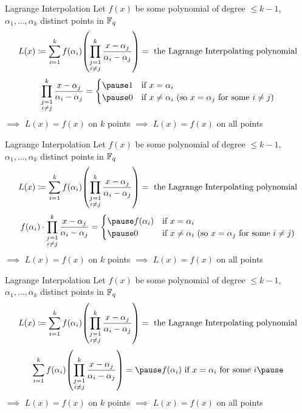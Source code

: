 \documentclass[aspectratio=169]{beamer}
\begin{document}
\begin{frame}{Lagrange Interpolation}
    Let $f(x)$ be some polynomial of degree $\leq k - 1$, $\alpha_1, \ldots, \alpha_{k}$ distinct points in $\mathbb{F}_q$
    \[
        L(x) \defeq \sum_{i = 1}^{k} f(\alpha_i) \pqty{\prod_{\substack{j = 1 \\ i \neq j}}^{k} \frac{x - \alpha_j}{\alpha_i - \alpha_j}} = \text{ the \emph{Lagrange Interpolating polynomial}}
    \]\pause
    \[
    \Prod_{\substack{j = 1 \\ i \neq j}}^{k} \frac{x - \alpha_j}{\alpha_i - \alpha_j} =     
    \begin{cases}\pause
        1 & \text{if } x = \alpha_i \\\pause
        0 & \text{if } x \neq \alpha_i\ (\text{so } x = \alpha_j\text{ for some } i \neq j)
    \end{cases}
    \]
    {\color{white}$\implies$ $L(x) = f(x)$ on $k$ points $\implies$ $L(x) = f(x)$ on all points}
\end{frame}

\begin{frame}{Lagrange Interpolation}
    Let $f(x)$ be some polynomial of degree $\leq k - 1$, $\alpha_1, \ldots, \alpha_{k}$ distinct points in $\mathbb{F}_q$
    \[
        L(x) \defeq \sum_{i = 1}^{k} f(\alpha_i) \pqty{\prod_{\substack{j = 1 \\ i \neq j}}^{k} \frac{x - \alpha_j}{\alpha_i - \alpha_j}} = \text{ the \emph{Lagrange Interpolating polynomial}}
    \]
    \[
    f(\alpha_i) \cdot \Prod_{\substack{j = 1 \\ i \neq j}}^{k} \frac{x - \alpha_j}{\alpha_i - \alpha_j} =     
    \begin{cases}\pause
        f(\alpha_i) & \text{if } x = \alpha_i \\\pause
        0 & \text{if } x \neq \alpha_i\ (\text{so } x = \alpha_j\text{ for some } i \neq j)
    \end{cases}
    \]
    {\color{white}$\implies$ $L(x) = f(x)$ on $k$ points $\implies$ $L(x) = f(x)$ on all points}
\end{frame}

\begin{frame}{Lagrange Interpolation}
    Let $f(x)$ be some polynomial of degree $\leq k - 1$, $\alpha_1, \ldots, \alpha_{k}$ distinct points in $\mathbb{F}_q$
    \[
        L(x) \defeq \sum_{i = 1}^{k} f(\alpha_i) \pqty{\prod_{\substack{j = 1 \\ i \neq j}}^{k} \frac{x - \alpha_j}{\alpha_i - \alpha_j}} = \text{ the \emph{Lagrange Interpolating polynomial}}
    \]
    \[
     \sum_{i = 1}^{k} f(\alpha_i) \pqty{\prod_{\substack{j = 1 \\ i \neq j}}^{k} \frac{x - \alpha_j}{\alpha_i - \alpha_j}} = \pause f(\alpha_i) \text{ if } x = \alpha_i \text{ for some } i \\\pause
    \]
    $\implies$ $L(x) = f(x)$ on $k$ points \pause $\implies$ $L(x) = f(x)$ on all points
\end{frame}
\end{document}
